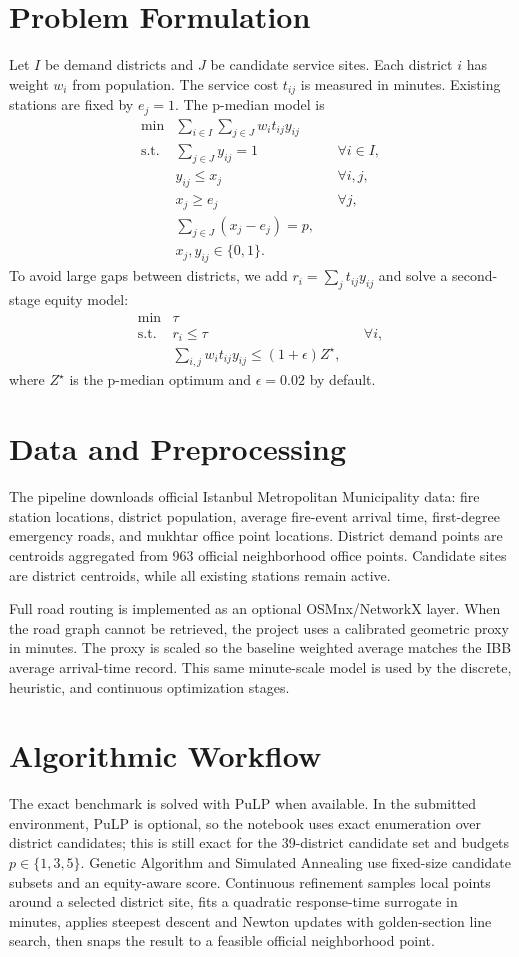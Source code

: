 \documentclass[conference]{IEEEtran}
\begin{document}
\section{Problem Formulation}
Let $I$ be demand districts and $J$ be candidate service sites. Each district $i$ has weight $w_i$ from population. The service cost $t_{ij}$ is measured in minutes. Existing stations are fixed by $e_j=1$. The p-median model is
\begin{align}
\min & \sum_{i \in I}\sum_{j \in J} w_i t_{ij} y_{ij}\\
\textrm{s.t. } & \sum_{j \in J} y_{ij}=1 && \forall i \in I,\\
& y_{ij}\le x_j && \forall i,j,\\
& x_j \ge e_j && \forall j,\\
& \sum_{j \in J}(x_j-e_j)=p,\\
& x_j,y_{ij}\in\{0,1\}.
\end{align}
To avoid large gaps between districts, we add $r_i=\sum_j t_{ij}y_{ij}$ and solve a second-stage equity model:
\begin{align}
\min & \tau\\
\textrm{s.t. } & r_i \le \tau && \forall i,\\
& \sum_{i,j} w_i t_{ij}y_{ij} \le (1+\epsilon) Z^\star,
\end{align}
where $Z^\star$ is the p-median optimum and $\epsilon=0.02$ by default.

\section{Data and Preprocessing}
The pipeline downloads official Istanbul Metropolitan Municipality data: fire station locations, district population, average fire-event arrival time, first-degree emergency roads, and mukhtar office point locations. District demand points are centroids aggregated from 963 official neighborhood office points. Candidate sites are district centroids, while all existing stations remain active.

Full road routing is implemented as an optional OSMnx/NetworkX layer. When the road graph cannot be retrieved, the project uses a calibrated geometric proxy in minutes. The proxy is scaled so the baseline weighted average matches the IBB average arrival-time record. This same minute-scale model is used by the discrete, heuristic, and continuous optimization stages.

\section{Algorithmic Workflow}
The exact benchmark is solved with PuLP when available. In the submitted environment, PuLP is optional, so the notebook uses exact enumeration over district candidates; this is still exact for the 39-district candidate set and budgets $p\in\{1,3,5\}$. Genetic Algorithm and Simulated Annealing use fixed-size candidate subsets and an equity-aware score. Continuous refinement samples local points around a selected district site, fits a quadratic response-time surrogate in minutes, applies steepest descent and Newton updates with golden-section line search, then snaps the result to a feasible official neighborhood point.
\end{document}
